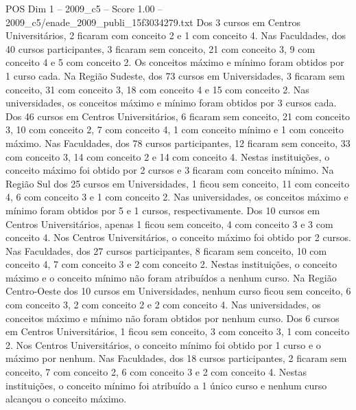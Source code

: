 \begin{textsample}{POS Dim 1 – 2009\_c5 – Score 1.00 – 2009\_c5/enade\_2009\_publi\_15f3034279.txt}
Dos 3 cursos em Centros Universitários, 2 ficaram com conceito 2 e 1 com conceito 4.
Nas Faculdades, dos 40 cursos participantes, 3 ficaram sem conceito, 21 com conceito 3, 9 com conceito 4 e 5 com conceito 2.
Os conceitos máximo e mínimo foram obtidos por 1 curso cada.
Na Região Sudeste, dos 73 cursos em Universidades, 3 ficaram sem conceito, 31 com conceito 3, 18 com conceito 4 e 15 com conceito 2.
Nas universidades, os conceitos máximo e mínimo foram obtidos por 3 cursos cada.
Dos 46 cursos em Centros Universitários, 6 ficaram sem conceito, 21 com conceito 3, 10 com conceito 2, 7 com conceito 4, 1 com conceito mínimo e 1 com conceito máximo.
Nas Faculdades, dos 78 cursos participantes, 12 ficaram sem conceito, 33 com conceito 3, 14 com conceito 2 e 14 com conceito 4.
Nestas instituições, o conceito máximo foi obtido por 2 cursos e 3 ficaram com conceito mínimo.
Na Região Sul dos 25 cursos em Universidades, 1 ficou sem conceito, 11 com conceito 4, 6 com conceito 3 e 1 com conceito 2.
Nas universidades, os conceitos máximo e mínimo foram obtidos por 5 e 1 cursos, respectivamente.
Dos 10 cursos em Centros Universitários, apenas 1 ficou sem conceito, 4 com conceito 3 e 3 com conceito 4.
Nos Centros Universitários, o conceito máximo foi obtido por 2 cursos.
Nas Faculdades, dos 27 cursos participantes, 8 ficaram sem conceito, 10 com conceito 4, 7 com conceito 3 e 2 com conceito 2.
Nestas instituições, o conceito máximo e o conceito mínimo não foram atribuídos a nenhum curso.
Na Região Centro-Oeste dos 10 cursos em Universidades, nenhum curso ficou sem conceito, 6 com conceito 3, 2 com conceito 2 e 2 com conceito 4.
Nas universidades, os conceitos máximo e mínimo não foram obtidos por nenhum curso.
Dos 6 cursos em Centros Universitários, 1 ficou sem conceito, 3 com conceito 3, 1 com conceito 2.
Nos Centros Universitários, o conceito mínimo foi obtido por 1 curso e o máximo por nenhum.
Nas Faculdades, dos 18 cursos participantes, 2 ficaram sem conceito, 7 com conceito 2, 6 com conceito 3 e 2 com conceito 4.
Nestas instituições, o conceito mínimo foi atribuído a 1 único curso e nenhum curso alcançou o conceito máximo.

\end{textsample}
